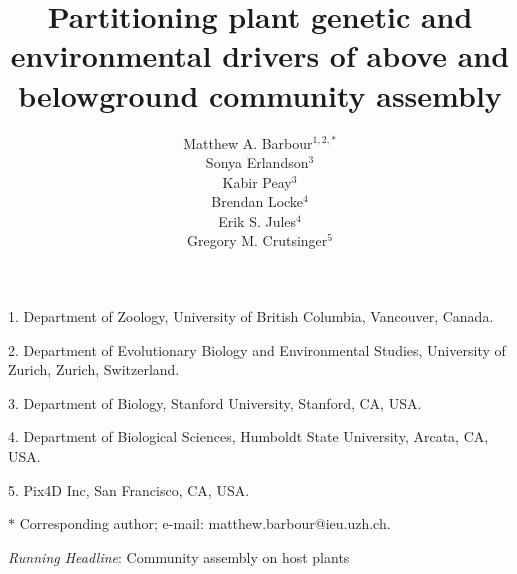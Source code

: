 \documentclass[11pt]{article}
\title{Partitioning plant genetic and environmental drivers of above and belowground community assembly}
\author{Matthew A. Barbour$^{1,2,\ast}$ \\ 
Sonya Erlandson$^3$ \\ 
Kabir Peay$^3$ \\
Brendan Locke$^4$ \\
Erik S. Jules$^4$ \\
Gregory M. Crutsinger$^5$}
\date{}
\begin{document}
\maketitle

\noindent{}1. Department of Zoology, University of British Columbia, Vancouver, Canada.

\noindent{}2. Department of Evolutionary Biology and Environmental Studies, University of Zurich, Zurich, Switzerland.

\noindent{}3. Department of Biology, Stanford University, Stanford, CA, USA.

\noindent{}4. Department of Biological Sciences, Humboldt State University, Arcata, CA, USA.

\noindent{}5. Pix4D Inc, San Francisco, CA, USA.

\noindent{}$\ast$ Corresponding author; e-mail: matthew.barbour@ieu.uzh.ch.


\bigskip


\textit{Running Headline}: Community assembly on host plants





\linenumbers{}
\modulolinenumbers[3]

\newpage{}
\end{document}
